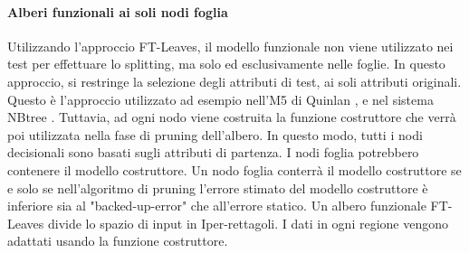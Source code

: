 \paragraph{Alberi funzionali ai soli nodi foglia}
\label{Alberi funzionali ai soli nodi foglia}
Utilizzando l'approccio FT-Leaves, il modello funzionale non viene utilizzato nei test per effettuare lo splitting, ma solo ed esclusivamente nelle foglie. In questo approccio, si restringe la selezione degli attributi di test, ai soli attributi originali.
Questo è l'approccio utilizzato ad esempio nell'M5 di Quinlan \cite{Quinlan93combininginstance-based}, e nel sistema NBtree \cite{Kohavi1996}. 
Tuttavia, ad ogni nodo viene costruita la funzione costruttore che verrà poi utilizzata nella fase di pruning dell'albero. In questo modo, tutti i nodi decisionali sono basati sugli attributi di partenza. I nodi foglia potrebbero contenere il modello costruttore. Un nodo foglia conterrà il modello costruttore se e solo se nell'algoritmo di pruning l'errore stimato del modello costruttore è inferiore sia al "backed-up-error" che all'errore statico. Un albero funzionale FT-Leaves divide lo spazio di input in Iper-rettagoli. I dati in ogni regione vengono adattati usando la funzione costruttore.

